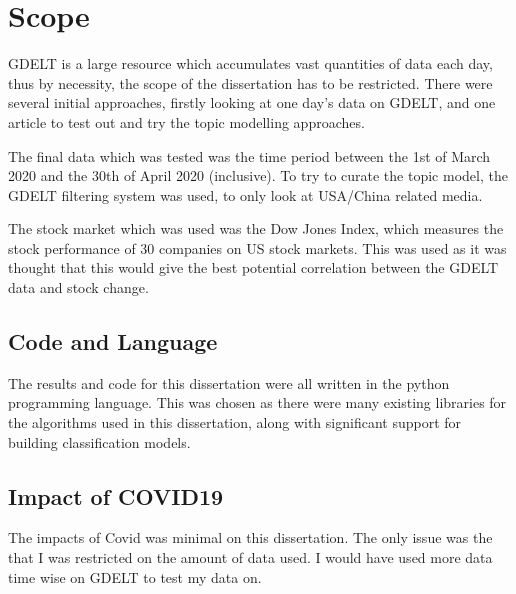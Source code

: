 \section{Scope}

GDELT is a large resource which accumulates vast quantities of data each day, thus by necessity, the scope of the dissertation has to be restricted. There were several initial approaches, firstly looking at one day's data on GDELT, and one article to test out and try the topic modelling approaches. 

The final data which was tested was the time period between the 1st of March 2020 and the 30th of April 2020 (inclusive). To try to curate the topic model, the GDELT filtering system was used, to only look at USA/China related media. 

The stock market which was used was the Dow Jones Index, which measures the stock performance of 30 companies on US stock markets. This was used as it was thought that this would give the best potential correlation between the GDELT data and stock change. 

\subsection{Code and Language}
The results and code for this dissertation were all written in the python programming language. This was chosen as there were many existing libraries for the algorithms used in this dissertation, along with significant support for building classification models.

\subsection{Impact of COVID19}
The impacts of Covid was minimal on this dissertation. The only issue was the that I was restricted on the amount of data used. I would have used more data time wise on GDELT to test my data on.